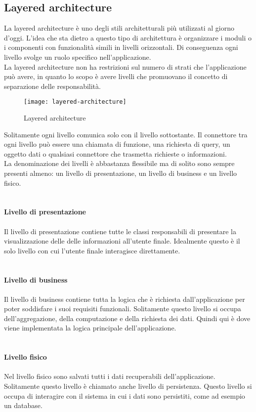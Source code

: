 \subsection{Layered architecture}
La layered architecture è uno degli stili architetturali più utilizzati al giorno d'oggi. L'idea che sta dietro a
questo tipo di architettura è organizzare i moduli o i componenti con funzionalità simili
in livelli orizzontali. Di conseguenza ogni livello svolge un ruolo specifico nell'applicazione.
\\
La layered architecture non ha restrizioni sul numero di strati che l'applicazione può avere, in quanto 
lo scopo è avere livelli che promuovano il concetto di separazione delle responsabilità.
\clearpage
\begin{figure}[H]
    \centering
    \texttt{[image: layered-architecture]}
    \caption{Layered architecture}
\end{figure}
\leavevmode\newline
Solitamente ogni livello comunica solo con il livello sottostante. Il connettore tra ogni livello può 
essere una chiamata di funzione, una richiesta di query, un oggetto dati o qualsiasi connettore che
trasmetta richieste o informazioni.
\\
La denominazione dei livelli è abbastanza flessibile ma di solito sono sempre presenti almeno: un livello di presentazione, un livello
di business e un livello fisico.
\\\\\\
\textbf{Livello di presentazione}
\\\\
Il livello di presentazione contiene tutte le classi responsabili di presentare la visualizzazione delle
delle informazioni all'utente finale. Idealmente questo è il solo livello con cui l'utente finale 
interagisce direttamente.
\\\\\\
\textbf{Livello di business}
\\\\
Il livello di business contiene tutta la logica che è richiesta dall'applicazione per poter soddisfare i 
suoi requisiti funzionali. Solitamente questo livello si occupa dell'aggregazione, della computazione
e della richiesta dei dati. Quindi qui è dove viene implementata la logica principale dell'applicazione.
\\\\\\
\textbf{Livello fisico}
\\\\
Nel livello fisico sono salvati tutti i dati recuperabili dell'applicazione. Solitamente questo livello è chiamato
anche livello di persistenza. Questo livello si occupa di interagire con il sistema in cui i dati 
sono persistiti, come ad esempio un database.
